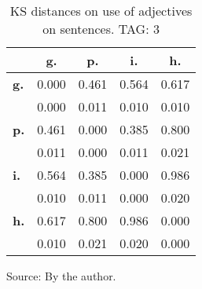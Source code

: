 \begin{table}[h!]
\begin{center}
\caption{KS distances on use of adjectives on sentences. TAG: 3}
\begin{tabular}{| l || c | c | c | c |}\hline
 & {\bf g.} & {\bf p.} & {\bf i.} & {\bf h.} \\\hline\hline
{\bf g.} & 0.000 & 0.461 & 0.564 & 0.617 \\
{\bf } & 0.000 & 0.011 & 0.010 & 0.010 \\\hline
{\bf p.} & 0.461 & 0.000 & 0.385 & 0.800 \\
{\bf } & 0.011 & 0.000 & 0.011 & 0.021 \\\hline
{\bf i.} & 0.564 & 0.385 & 0.000 & 0.986 \\
{\bf } & 0.010 & 0.011 & 0.000 & 0.020 \\\hline
{\bf h.} & 0.617 & 0.800 & 0.986 & 0.000 \\
{\bf } & 0.010 & 0.021 & 0.020 & 0.000 \\\hline
\end{tabular}
\begin{flushleft}
		Source: By the author.\
\end{flushleft}
\end{center}
\end{table}
